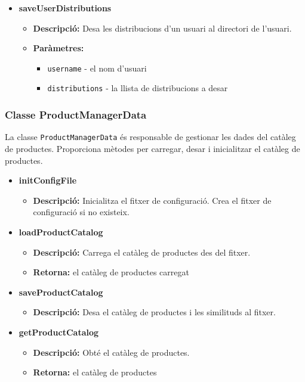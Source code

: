 \documentclass[a4paper, t]{article}
\begin{document}
\begin{itemize}
\item \textbf{saveUserDistributions}
\begin{itemize}
    \item \textbf{Descripció:} Desa les distribucions d'un usuari al directori de l'usuari.
    \item \textbf{Paràmetres:}
    \begin{itemize}
        \item \texttt{username} - el nom d'usuari
        \item \texttt{distributions} - la llista de distribucions a desar
    \end{itemize}
\end{itemize}
\end{itemize}

\newpage
\subsubsection{Classe ProductManagerData} La classe \texttt{ProductManagerData} és responsable de gestionar les dades del catàleg de productes. Proporciona mètodes per carregar, desar i inicialitzar el catàleg de productes.  \begin{itemize} \item \textbf{initConfigFile} \begin{itemize} \item \textbf{Descripció:} Inicialitza el fitxer de configuració. Crea el fitxer de configuració si no existeix. \end{itemize}
\item \textbf{loadProductCatalog}
\begin{itemize}
    \item \textbf{Descripció:} Carrega el catàleg de productes des del fitxer.
    \item \textbf{Retorna:} el catàleg de productes carregat
\end{itemize}

\item \textbf{saveProductCatalog}
\begin{itemize}
    \item \textbf{Descripció:} Desa el catàleg de productes i les similituds al fitxer.
\end{itemize}

\item \textbf{getProductCatalog}
\begin{itemize}
    \item \textbf{Descripció:} Obté el catàleg de productes.
    \item \textbf{Retorna:} el catàleg de productes
\end{itemize}


\end{itemize}
\end{document}
